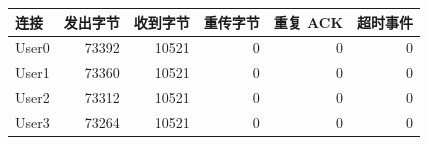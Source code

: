 \begin{tabular}{lrrrrr}\toprule
连接 & 发出字节 & 收到字节 & 重传字节 & 重复 ACK & 超时事件\\\midrule
User0 & 73392 & 10521 & 0 & 0 & 0 \\
User1 & 73360 & 10521 & 0 & 0 & 0 \\
User2 & 73312 & 10521 & 0 & 0 & 0 \\
User3 & 73264 & 10521 & 0 & 0 & 0 \\
\bottomrule\end{tabular}

